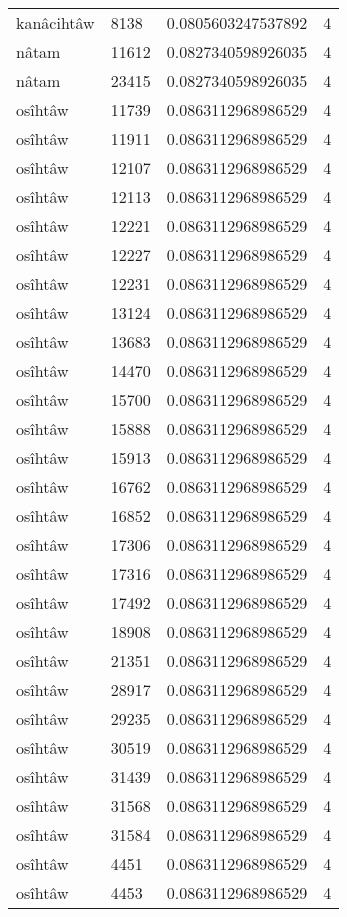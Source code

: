 \begin{longtable}{llll}
kanâcihtâw & 8138 & 0.0805603247537892 & 4 \\
nâtam & 11612 & 0.0827340598926035 & 4 \\
nâtam & 23415 & 0.0827340598926035 & 4 \\
osîhtâw & 11739 & 0.0863112968986529 & 4 \\
osîhtâw & 11911 & 0.0863112968986529 & 4 \\
osîhtâw & 12107 & 0.0863112968986529 & 4 \\
osîhtâw & 12113 & 0.0863112968986529 & 4 \\
osîhtâw & 12221 & 0.0863112968986529 & 4 \\
osîhtâw & 12227 & 0.0863112968986529 & 4 \\
osîhtâw & 12231 & 0.0863112968986529 & 4 \\
osîhtâw & 13124 & 0.0863112968986529 & 4 \\
osîhtâw & 13683 & 0.0863112968986529 & 4 \\
osîhtâw & 14470 & 0.0863112968986529 & 4 \\
osîhtâw & 15700 & 0.0863112968986529 & 4 \\
osîhtâw & 15888 & 0.0863112968986529 & 4 \\
osîhtâw & 15913 & 0.0863112968986529 & 4 \\
osîhtâw & 16762 & 0.0863112968986529 & 4 \\
osîhtâw & 16852 & 0.0863112968986529 & 4 \\
osîhtâw & 17306 & 0.0863112968986529 & 4 \\
osîhtâw & 17316 & 0.0863112968986529 & 4 \\
osîhtâw & 17492 & 0.0863112968986529 & 4 \\
osîhtâw & 18908 & 0.0863112968986529 & 4 \\
osîhtâw & 21351 & 0.0863112968986529 & 4 \\
osîhtâw & 28917 & 0.0863112968986529 & 4 \\
osîhtâw & 29235 & 0.0863112968986529 & 4 \\
osîhtâw & 30519 & 0.0863112968986529 & 4 \\
osîhtâw & 31439 & 0.0863112968986529 & 4 \\
osîhtâw & 31568 & 0.0863112968986529 & 4 \\
osîhtâw & 31584 & 0.0863112968986529 & 4 \\
osîhtâw & 4451 & 0.0863112968986529 & 4 \\
osîhtâw & 4453 & 0.0863112968986529 & 4 \\

\end{longtable}
